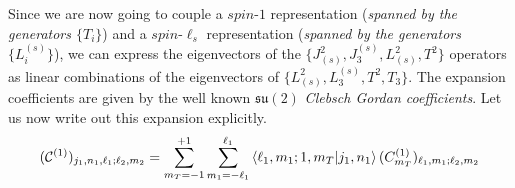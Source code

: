 %
%
Since we are now going to couple a $spin$-$1$ representation (\textit{spanned by the generators $\{ T_i \}$}) and a $spin$-$\ell_s$ representation (\textit{spanned by the generators $\{ L_i^{(s)} \}$}), we can express the eigenvectors of the $\{ J^2_{(s)}, J_3^{(s)} , L^2_{(s)} , T^2 \}$ operators as linear combinations of the eigenvectors of $\{ L^2_{(s)}, L_3^{(s)} , T^2 , T_3 \}$. The expansion coefficients are given by the well known $\mathfrak{su}(2)$ \textit{Clebsch Gordan coefficients}. Let us now write out this expansion explicitly.
%
%
\begin{equation}\label{j1-fields}
(\mathcal{C}^{(1)})_{j_1,n_1,\ell_1; \ell_2, m_2}
=
\sum_{m_T = -1}^{+1}
\sum_{m_1 = -\ell_1}^{\ell_1}
\braket{\ell_1,m_1;1,m_T}{j_1, n_1}
(C^{(1)}_{m_T})_{\ell_1,m_1;\ell_2,m_2}
\end{equation}
%
%

